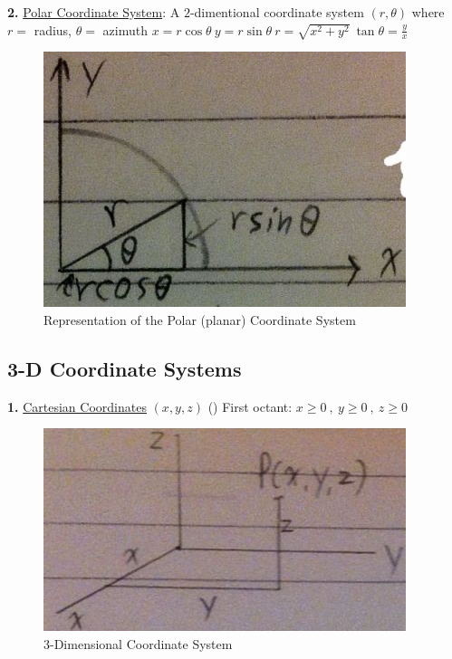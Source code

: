 \documentclass[12pt]{article}
\begin{document}
\begin{flushleft}
	\textbf{2.} \uline{Polar Coordinate System}: A $2$-dimentional coordinate system $(r,\theta)$  \linebreak 
	where $r = $ radius, $\theta = $ azimuth \linebreak 
	$\displaystyle x = r \cos \theta \ y = r \sin \theta \ r = \sqrt{x^2 +y^2} \ \tan \theta = \frac{y}{x} $ 
	
	\begin{figure}[H]
	\centering
	\includegraphics[scale=0.6]{2dPolarCoordinateSystem}
	\caption{Representation of the Polar (planar) Coordinate System}
	\label{fig:2dPolarCoordinateSystem}
	\end{figure}
	
	\subsection{3-D Coordinate Systems}	
		
	\textbf{1.} \uline{Cartesian Coordinates} $(x,y,z)$ () \linebreak 
	First octant: $\displaystyle x\geq 0 \ , \ y \geq 0 \ , \ z \geq 0$ \linebreak 	
	
	\begin{figure}[H]
	\centering
	\includegraphics[scale=0.8]{3dcartesianCoordinateSystem}
	\caption{3-Dimensional Coordinate System}
	\label{fig:3dcartesianCoordinateSystem}
	\end{figure}
	

\end{flushleft}
\end{document}
